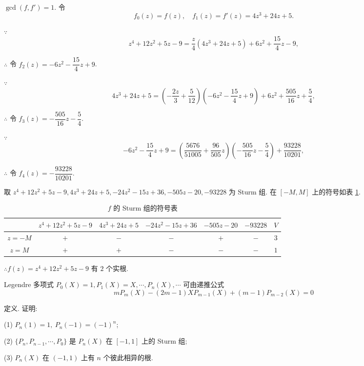 \documentclass[UTF8]{ctexart}
\begin{document}
\begin{solution}
    $\gcd(f,f')=1$. 令
    \[f_0(z)=f(z),\quad f_1(z)=f'(z)=4z^3+24z+5.\]

    $\because$
    \[z^4+12z^2+5z-9=\dfrac{z}{4}(4z^3+24z+5)+6z^2+\dfrac{15}{4}z-9,\]

    $\therefore$ 令 $f_2(z)=-6z^2-\dfrac{15}{4}z+9$.

    $\because$
    \[4z^3+24z+5=\left(-\dfrac{2z}{3}+\dfrac{5}{12}\right)(-6z^2-\dfrac{15}{4}z+9)+6z^2+\dfrac{505}{16}z+\dfrac{5}{4},\]

    $\therefore$ 令 $f_3(z)=-\dfrac{505}{16}z-\dfrac{5}{4}$.

    $\because$
    \[-6z^2-\dfrac{15}{4}z+9=\left(\dfrac{5676}{51005} + \dfrac{96}{505}z\right)\left(-\dfrac{505}{16}z-\dfrac{5}{4}\right)+\dfrac{93228}{10201},\]

    $\therefore$ 令 $f_4(z)=-\dfrac{93228}{10201}$.

    取 $z^4+12z^2+5z-9,4z^3+24z+5,-24z^2-15z+36,-505z-20,-93228$ 为 Sturm 组. 在 $[-M,M]$ 上的符号如表 \ref{tb3}.

    \begin{table}\caption{$f$ 的 Sturm 组的符号表}\label{tb3}
        \begin{center}
            \begin{tabular}{c|ccccc|c}
                & $z^4+12z^2+5z-9$ & $4z^3+24z+5$ & $-24z^2-15z+36$ & $-505z-20$ & $-93228$ & $V$ \\
                \hline
                $z=-M$ & $+$ & $-$ & $-$ & $+$ & $-$ & $3$ \\
                $z=M$  & $+$ & $+$ & $-$ & $-$ & $-$ & $1$ \\
            \end{tabular}
        \end{center}
    \end{table}

    $\therefore f(z)=z^4+12z^2+5z-9$ 有 $2$ 个实根.
\end{solution}
\begin{exercise}%
    Legendre 多项式 $P_0(X)=1,P_1(X)=X,\cdots,P_n(X),\cdots$ 可由递推公式
    \begin{equation}\label{eq5.4}
        mP_m(X)-(2m-1)XP_{m-1}(X)+(m-1)P_{m-2}(X)=0
    \end{equation}

    定义. 证明:

    (1) $P_n(1)=1,\ P_n(-1)=(-1)^n$;

    (2) $\{P_n,P_{n-1},\cdots,P_0\}$ 是 $P_n(X)$ 在 $[-1,1]$ 上的 Sturm 组;

    (3) $P_n(X)$ 在 $(-1,1)$ 上有 $n$ 个彼此相异的根.
\end{exercise}
\end{document}
